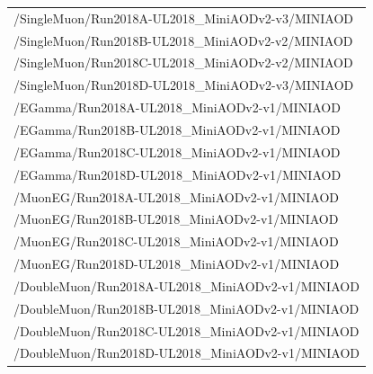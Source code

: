 \begin{table}[h]
\scriptsize
    \centering
    \begin{tabular}{l}
\hline %
/SingleMuon/Run2018A-UL2018\_MiniAODv2-v3/MINIAOD \\
/SingleMuon/Run2018B-UL2018\_MiniAODv2-v2/MINIAOD \\
/SingleMuon/Run2018C-UL2018\_MiniAODv2-v2/MINIAOD \\
/SingleMuon/Run2018D-UL2018\_MiniAODv2-v3/MINIAOD \\
\hline
/EGamma/Run2018A-UL2018\_MiniAODv2-v1/MINIAOD \\
/EGamma/Run2018B-UL2018\_MiniAODv2-v1/MINIAOD \\
/EGamma/Run2018C-UL2018\_MiniAODv2-v1/MINIAOD \\
/EGamma/Run2018D-UL2018\_MiniAODv2-v1/MINIAOD \\
\hline
/MuonEG/Run2018A-UL2018\_MiniAODv2-v1/MINIAOD \\
/MuonEG/Run2018B-UL2018\_MiniAODv2-v1/MINIAOD \\
/MuonEG/Run2018C-UL2018\_MiniAODv2-v1/MINIAOD \\
/MuonEG/Run2018D-UL2018\_MiniAODv2-v1/MINIAOD \\
\hline
/DoubleMuon/Run2018A-UL2018\_MiniAODv2-v1/MINIAOD \\
/DoubleMuon/Run2018B-UL2018\_MiniAODv2-v1/MINIAOD \\
/DoubleMuon/Run2018C-UL2018\_MiniAODv2-v1/MINIAOD \\
/DoubleMuon/Run2018D-UL2018\_MiniAODv2-v1/MINIAOD \\
\hline
     \end{tabular}
\small
    \label{tab:datasets_data_18}
\end{table}


